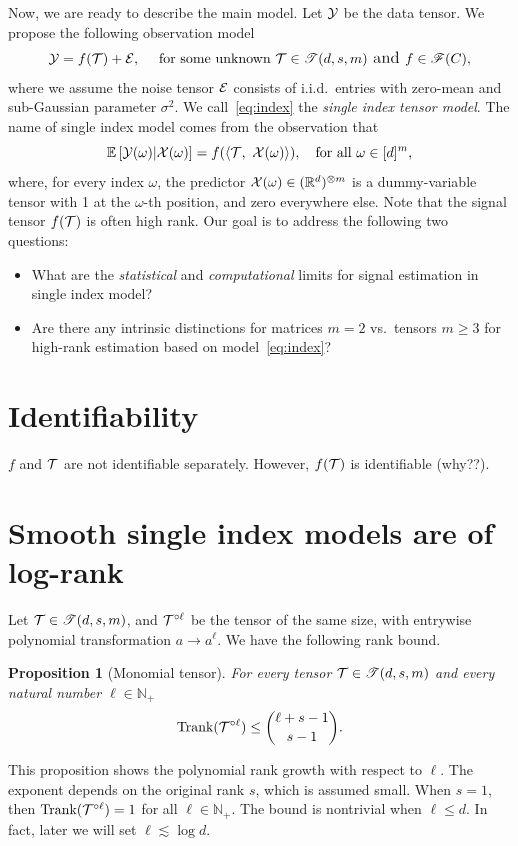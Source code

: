 \documentclass[final,12pt]{colt2020} %
\newtheorem{prop}{Proposition}
\def\rank{\textup{Trank}}
\def\calif{\large\mathscr{F}}
\def\caliT{\large\mathscr{T}}
\begin{document}
Now, we are ready to describe the main model. Let $\mathcal{Y}$ be the data tensor. We propose the following observation model
\begin{equation}\label{eq:index}
\tY=f(\tT)+\tE, \quad \text{ for some unknown } \tT\in\caliT(d,s,m) \text{ and }f\in\calif(C),
\end{equation}
where we assume the noise tensor $\mathcal{E}$ consists of i.i.d.\ entries with zero-mean and sub-Gaussian parameter $\sigma^2$. We call~\eqref{eq:index} the \emph{single index tensor model}. The name of single index model comes from the observation that 
\[
\mathbb{E}\left[\mathcal{Y}(\omega)|\mathcal{X}(\omega)\right]=f(\langle \mathcal{T},\  \mathcal{X}(\omega)\rangle), \quad \text{for all }\omega\in[d]^m,
\]
where, for every index $\omega$, the predictor $\mathcal{X}(\omega)\in(\mathbb{R}^d)^{\otimes m}$ is a dummy-variable tensor with 1 at the $\omega$-th position, and zero everywhere else. 
Note that the signal tensor $f(\mathcal{T})$ is often high rank. Our goal is to address the following two questions:
\begin{itemize}
\item What are the \emph{statistical} and \emph{computational} limits for signal estimation in single index model?
\item Are there any intrinsic distinctions for matrices $m=2$ vs.\ tensors $m\geq 3$ for high-rank estimation based on model~\eqref{eq:index}?
\end{itemize}

\section{Identifiability}
$f$ and $\mathcal{T}$ are not identifiable separately. However, $f(\mathcal{T})$ is identifiable (why??). 


\section{Smooth single index models are of log-rank}
Let $\tT\in \caliT(d,s,m)$, and $\mathcal{T}^{\circ \ell}$ be the tensor of the same size, with entrywise polynomial transformation $a\to a^\ell$. We have the following rank bound.
\begin{prop}[Monomial tensor] For every tensor $\tT\in\caliT(d,s,m)$ and every natural number $\ell\in\mathbb{N}_{+}$
\[
\rank(\tT^{\circ \ell})\leq {\ell+s-1 \choose s-1}.
\]
\end{prop}
This proposition shows the polynomial rank growth with respect to $\ell$. The exponent depends on the original rank $s$, which is assumed small. When $s=1$, then $\rank(\tT^{\circ \ell})=1$ for all $\ell\in\mathbb{N}_{+}$. The bound is nontrivial when $\ell \leq d$. In fact, later we will set $\ell \lesssim \log d$. 
\end{document}
